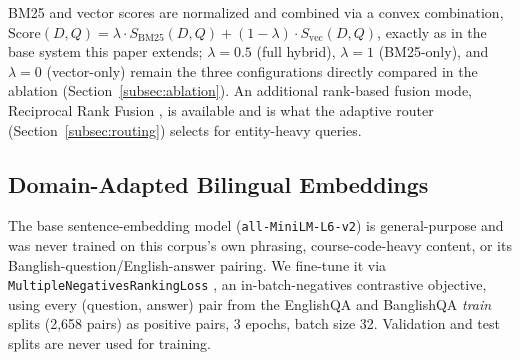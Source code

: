 \documentclass[a4paper,twoside]{article}
\begin{document}
BM25 and vector scores are normalized and combined via a convex combination, $\mathrm{Score}(D,Q) = \lambda \cdot S_{\mathrm{BM25}}(D,Q) + (1-\lambda) \cdot S_{\mathrm{vec}}(D,Q)$, exactly as in the base system this paper extends; $\lambda=0.5$ (full hybrid), $\lambda=1$ (BM25-only), and $\lambda=0$ (vector-only) remain the three configurations directly compared in the ablation (Section~\ref{subsec:ablation}). An additional rank-based fusion mode, Reciprocal Rank Fusion \citep{cormack2009}, is available and is what the adaptive router (Section~\ref{subsec:routing}) selects for entity-heavy queries.

\subsection{Domain-Adapted Bilingual Embeddings}
\label{subsec:finetune}

The base sentence-embedding model (\texttt{all-MiniLM-L6-v2}) is general-purpose and was never trained on this corpus's own phrasing, course-code-heavy content, or its Banglish-question/English-answer pairing. We fine-tune it via \texttt{MultipleNegativesRankingLoss} \citep{henderson2017mnr}, an in-batch-negatives contrastive objective, using every (question, answer) pair from the EnglishQA and BanglishQA \emph{train} splits (2{,}658 pairs) as positive pairs, 3 epochs, batch size 32. Validation and test splits are never used for training.
\end{document}
